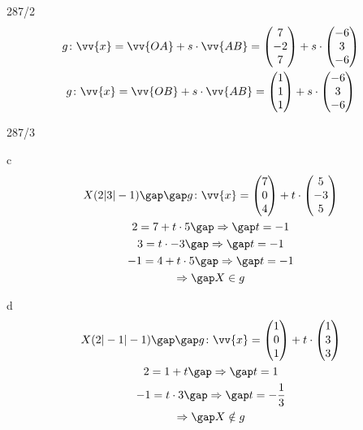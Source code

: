 \begin{exercise}{287/2}
\begin{gather*}
    g \colon \vv{x} = \vv{OA} + s \cdot \vv{AB} = \begin{pmatrix}7 \\ -2 \\ 7\end{pmatrix} + s \cdot \begin{pmatrix}-6 \\ 3 \\ -6\end{pmatrix} \\
    g \colon \vv{x} = \vv{OB} + s \cdot \vv{AB} = \begin{pmatrix}1 \\ 1 \\ 1\end{pmatrix} + s \cdot \begin{pmatrix}-6 \\ 3 \\ -6\end{pmatrix}
  \end{gather*}
\end{exercise}
\begin{exercise}{287/3}
  \item [c]
  \begin{gather*}
    X(2|3|-1) \gap\gap g \colon \vv{x} = \begin{pmatrix}7 \\ 0 \\ 4\end{pmatrix} + t \cdot \begin{pmatrix}5 \\ -3 \\ 5\end{pmatrix} \\
    2 = 7 + t \cdot 5 \gap\Rightarrow\gap t = -1 \\
    3 = t \cdot -3 \gap\Rightarrow\gap t = -1 \\
    -1 = 4 + t \cdot 5 \gap\Rightarrow\gap t = -1 \\
    \Rightarrow\gap X \in g
  \end{gather*}
  \item [d]
  \begin{gather*}
    X(2|-1|-1) \gap\gap g \colon \vv{x} = \begin{pmatrix}1 \\ 0 \\ 1\end{pmatrix} + t \cdot \begin{pmatrix}1 \\ 3 \\ 3\end{pmatrix} \\
    2 = 1 + t \gap\Rightarrow\gap t = 1 \\
    -1 = t \cdot 3 \gap\Rightarrow\gap t = -\frac{1}{3} \\
    \Rightarrow\gap X \notin g
  \end{gather*}
\end{exercise}
